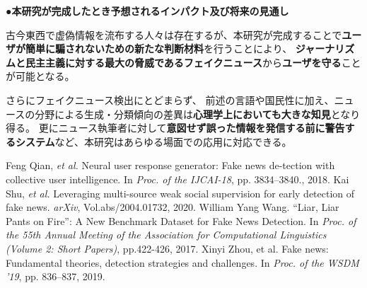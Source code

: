 {	\noindent
	●\textbf{本研究が完成したとき予想されるインパクト及び将来の見通し}

	古今東西で虚偽情報を流布する人々は存在するが、本研究が完成することで\textbf{ユーザが簡単に騙されないための新たな判断材料}を行うことにより、
	\textbf{ジャーナリズムと民主主義に対する最大の脅威であるフェイクニュース}\cite{zhou2019wsdm}から\textbf{ユーザを守る}ことが可能となる。

	さらにフェイクニュース検出にとどまらず、
	前述の言語や国民性に加え、ニュースの分野による生成・分類傾向の差異は\textbf{心理学上においても大きな知見}となり得る。
	更にニュース執筆者に対して\textbf{意図せず誤った情報を発信する前に警告するシステム}など、本研究はあらゆる場面での応用に対応できる。
	

	{\footnotesize
		\begin{thebibliography}{99}
			\setcounter{enumiv}{7}
			\vspace*{-2mm}
			\setlength{\parskip}{0cm}
			\setlength{\itemsep}{0cm}
			\begin{spacing}{0.7}
				 Feng Qian, \textit{et al.} Neural user response generator: Fake news de-tection with collective user intelligence. In \textit{Proc. of the IJCAI-18}, pp. 3834–3840., 2018.
				 Kai Shu, \textit{et al.} Leveraging multi-source weak social supervision for early detection of fake news. \textit{arXiv}, Vol.abs/2004.01732, 2020.
				William Yang Wang. ``Liar, Liar Pants on Fire'': A New Benchmark Dataset for Fake News Detection. In \textit{Proc. of the 55th Annual Meeting of the Association for Computational Linguistics (Volume 2: Short Papers)}, pp.422-426, 2017.
				Xinyi Zhou, et al. Fake news: Fundamental theories, detection strategies and challenges. In \textit{Proc. of the WSDM '19}, pp. 836–837, 2019.
			\end{spacing}
		\end{thebibliography}
	}
}

